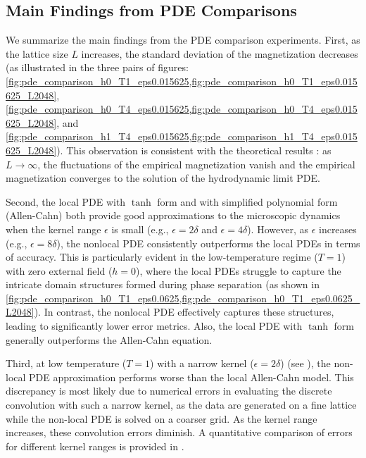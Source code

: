 \documentclass[11pt,a4paper]{article}
\begin{document}
\subsection{Main Findings from PDE Comparisons}
\label{subsec:main_findings}
We summarize the main findings from the PDE comparison experiments.
First, as the lattice size $L$ increases, the standard deviation of the magnetization decreases 
(as illustrated in the three pairs of figures: 
\cref{fig:pde_comparison_h0_T1_eps0.015625,fig:pde_comparison_h0_T1_eps0.015625_L2048}, 
\cref{fig:pde_comparison_h0_T4_eps0.015625,fig:pde_comparison_h0_T4_eps0.015625_L2048}, 
and \cref{fig:pde_comparison_h1_T4_eps0.015625,fig:pde_comparison_h1_T4_eps0.015625_L2048}). 
This observation is consistent with the theoretical results : as $L \to \infty$, the fluctuations of the empirical magnetization vanish and the empirical magnetization converges to the solution of the hydrodynamic limit PDE.

Second, the local PDE with $\tanh$ form and with simplified polynomial form (Allen-Cahn) both provide good approximations to the microscopic dynamics when the kernel range $\epsilon$ is small (e.g., $\epsilon=2\delta$ and $\epsilon=4\delta$). 
However, as $\epsilon$ increases (e.g., $\epsilon=8\delta$), the nonlocal PDE consistently outperforms the local PDEs in terms of accuracy. 
This is particularly evident in the low-temperature regime ($T=1$) with zero external field ($h=0$), where the local PDEs struggle to capture the intricate domain structures formed during phase separation (as shown in \cref{fig:pde_comparison_h0_T1_eps0.0625,fig:pde_comparison_h0_T1_eps0.0625_L2048}). 
In contrast, the nonlocal PDE effectively captures these structures, leading to significantly lower error metrics.
Also, the local PDE with $\tanh$ form generally outperforms the Allen-Cahn equation.

Third, at low temperature ($T=1$) with a narrow kernel ($\epsilon = 2\delta$) 
(see ), 
the non-local PDE approximation performs worse than the local Allen-Cahn model. 
This discrepancy is most likely due to numerical errors in evaluating the discrete convolution with such a narrow kernel, 
as the data are generated on a fine lattice while the non-local PDE is solved on a coarser grid. 
As the kernel range increases, these convolution errors diminish. 
A quantitative comparison of errors for different kernel ranges is provided in .
\end{document}
